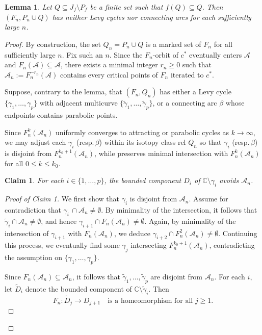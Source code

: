 \documentclass[a4paper,reqno,times, 11pt]{amsart}
\newtheorem{lemma}[theorem]{Lemma}
\theoremstyle{remark}
\theoremstyle{plain}
\numberwithin{equation}{section}
\def\AAA{{\cal A}}
\def\g{\gamma}
\def\C{\mbox{$\mathbb C$}}
\def\cal{\mathcal}
\begin{document}
\begin{lemma}\label{pro:c-equivalent}
Let $Q\subseteq J_f\setminus P_f$ be a finite set such that $f(Q)\subseteq Q$. Then $(F_n,P_{n}\cup Q) $ has neither Levy cycles nor connecting arcs for each sufficiently large $n$.
\end{lemma}
\begin{proof}
By construction, the set $Q_n=P_n\cup Q$ is  a marked set of $F_n$ for all sufficiently large $n$. Fix such an $n$. Since the $F_n$-orbit of $c^*$ eventually enters $\AAA$ and $F_n(\AAA)\subseteq \AAA$, there exists a minimal integer $r_n\geq0$ such that $\AAA_n:=F_n^{-r_n}(\AAA)$ contains every critical points of $F_n$ iterated to $c^*$.
			
			
Suppose, contrary to the lemma, that $(F_n,Q_n)$ has either a Levy cycle $\{\gamma_1,\ldots,\gamma_p\}$ with adjacent multicurve $\{\widetilde{\gamma}_1,\ldots,\widetilde{\gamma}_p\}$, or a connecting arc $\beta$ whose endpoints contains parabolic points.
			
Since $F_n^k(\AAA_n)$ uniformly converges to attracting or parabolic cycles as $k\to\infty$, we may adjust each $\gamma_i$ (resp.\,$\beta$) within its isotopy class rel $Q_n$ so that $\gamma_i$ (resp.\,$\beta$) is disjoint from $F_n^{k_0+1}(\mathcal{A}_n)$, while preserves  minimal intersection  with $F_n^k(\mathcal{A}_n)$ for all $0\leq k\leq k_0$.\vspace{8pt}
			
			{\bf Claim 1}. \emph{For each $i\in\{1,\ldots,p\}$, the bounded component $D_i$ of $\C\setminus \g_i$ avoids $\AAA_n$. }
			
			\begin{proof}[Proof of Claim 1]
				We first show that $\gamma_i$ is disjoint from $\mathcal{A}_n$. Assume for contradiction that $\gamma_i \,\cap \mathcal{A}_n \neq \emptyset$. By minimality of the intersection, it follows that $\widetilde{\gamma}_i \cap \mathcal{A}_n \neq \emptyset$, and hence $\gamma_{i+1} \cap F_n(\mathcal{A}_n) \neq \emptyset$. Again, by minimality of the intersection of $\gamma_{i+1}$ with $F_n(\mathcal{A}_n)$, we deduce $\gamma_{i+2} \cap F_n^2(\mathcal{A}_n) \neq \emptyset$. Continuing this process, we eventually find some $\gamma_j$ intersecting $F_n^{k_0+1}(\mathcal{A}_n)$, contradicting the assumption on $\{\gamma_1, \dots, \gamma_p\}$.
				
				Since \(F_n(\mathcal{A}_n) \subseteq \mathcal{A}_n\), it follows that \(\widetilde{\gamma}_1, \ldots, \widetilde{\gamma}_p\) are disjoint from \(\mathcal{A}_n\). For each \(i\), let \(\widetilde{D}_i\) denote the bounded component of \(\mathbb{C}\setminus\widetilde{\gamma}_i\). Then
				\begin{equation}\label{eq:45}
					F_n: \widetilde{D}_j \to D_{j+1} \quad \text{is a homeomorphism for all } j \geq 1.
				\end{equation}
				

\end{proof}
\end{proof}
\end{document}
